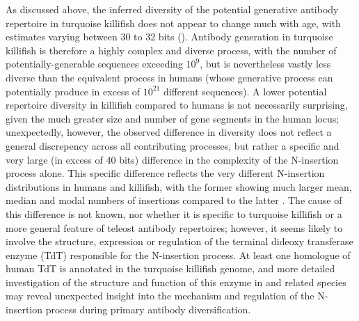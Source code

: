As discussed above, the inferred diversity of the potential generative antibody repertoire in turquoise killifish does not appear to change much with age, with estimates varying between 30 to 32 bits (). Antibody generation in turquoise killifish is therefore a highly complex and diverse process, with the number of potentially-generable sequences exceeding $10^9$, but is nevertheless  vastly less diverse than the equivalent process in humans (whose generative process can potentially produce in excess of $10^{21}$ different sequences). A lower potential repertoire diversity in killifish compared to humans is not necessarily surprising, given the much greater size and number of gene segments in the human \igh{} locus; unexpectedly, however, the observed difference in diversity does not reflect a general discrepency across all contributing processes, but rather a specific and very large (in excess of 40 bits) difference in the complexity of the N-insertion process alone. This specific difference reflects the very different N-insertion distributions in humans and killifish, with the former showing much larger mean, median and modal numbers of insertions compared to the latter \parencite{elhanati2015model}. The cause of this difference is not known, nor whether it is specific to turquoise killifish or a more general feature of teleost antibody repertoires; however, it seems likely to involve the structure, expression or regulation of the terminal dideoxy transferase enzyme (TdT) responsible for the N-insertion process. At least one homologue of human TdT is annotated in the turquoise killifish genome, and more detailed investigation of the structure and function of this enzyme in \nfu and related species may reveal unexpected insight into the mechanism and regulation of the N-insertion process during primary antibody diversification.

